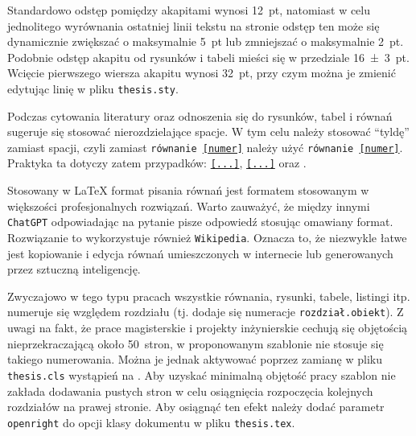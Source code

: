 Standardowo odstęp pomiędzy akapitami wynosi \qty{12}{pt}, natomiast w celu jednolitego wyrównania ostatniej linii tekstu na stronie odstęp ten może się dynamicznie zwiększać o maksymalnie \qty{5}{pt} lub zmniejszać o maksymalnie \qty{2}{pt}. Podobnie odstęp akapitu od rysunków i tabeli mieści się w przedziale \qty{16 \pm 3}{pt}. Wcięcie pierwszego wiersza akapitu wynosi \qty{32}{pt}, przy czym można je zmienić edytując linię \texttt{\setlength{\parindent}{32pt}} w pliku \texttt{thesis.sty}.

Podczas cytowania literatury oraz odnoszenia się do rysunków, tabel i równań sugeruje się stosować nierozdzielające spacje. W tym celu należy stosować \enquote{tyldę} zamiast spacji, czyli zamiast \texttt{równanie \eqref{numer}} należy użyć \texttt{równanie~\eqref{numer}}. Praktyka ta dotyczy zatem przypadków: \texttt{\eqref{...}}, \texttt{\ref{...}} oraz \texttt{\cite{...}}.

Stosowany w \LaTeX{} format pisania równań jest formatem stosowanym w większości profesjonalnych rozwiązań. Warto zauważyć, że między innymi \texttt{ChatGPT} odpowiadając na pytanie pisze odpowiedź stosując omawiany format. Rozwiązanie to wykorzystuje również \texttt{Wikipedia}. Oznacza to, że niezwykle łatwe jest kopiowanie i edycja równań umieszczonych w internecie lub generowanych przez sztuczną inteligencję.

Zwyczajowo w tego typu pracach wszystkie równania, rysunki, tabele, listingi itp. numeruje się względem rozdziału (tj. dodaje się numeracje \texttt{rozdział.obiekt}). Z uwagi na fakt, że prace magisterskie i projekty inżynierskie cechują się objętością nieprzekraczającą około \qty{50}{stron}, w proponowanym szablonie nie stosuje się takiego numerowania. Można je jednak aktywować poprzez zamianę w pliku \texttt{thesis.cls} wystąpień \texttt{} na \texttt{}. Aby uzyskać minimalną objętość pracy szablon nie zakłada dodawania pustych stron w celu osiągnięcia rozpoczęcia kolejnych rozdziałów na prawej stronie. Aby osiągnąć ten efekt należy dodać parametr \texttt{openright} do opcji klasy dokumentu w pliku \texttt{thesis.tex}.

